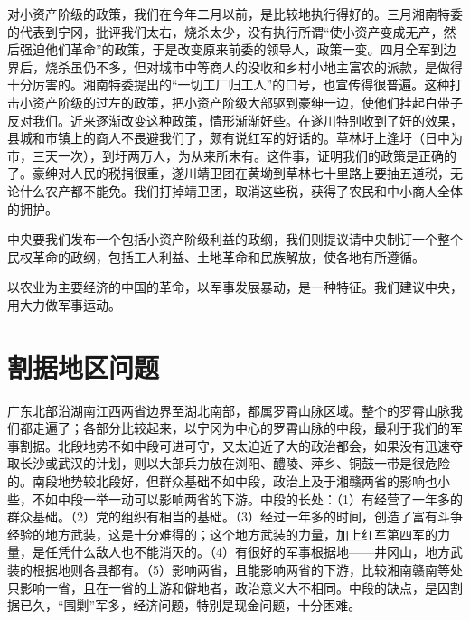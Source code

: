 对小资产阶级的政策，我们在今年二月以前，是比较地执行得好的。三月湘南特委的代表到宁冈，批评我们太右，烧杀太少，没有执行所谓“使小资产变成无产，然后强迫他们革命”的政策，于是改变原来前委的领导人，政策一变。四月全军到边界后，烧杀虽仍不多，但对城市中等商人的没收和乡村小地主富农的派款，是做得十分厉害的。湘南特委提出的“一切工厂归工人”的口号，也宣传得很普遍。这种打击小资产阶级的过左的政策，把小资产阶级大部驱到豪绅一边，使他们挂起白带子反对我们。近来逐渐改变这种政策，情形渐渐好些。在遂川特别收到了好的效果，县城和市镇上的商人不畏避我们了，颇有说红军的好话的。草林圩上逢圩（日中为市，三天一次），到圩两万人，为从来所未有。这件事，证明我们的政策是正确的了。豪绅对人民的税捐很重，遂川靖卫团在黄坳到草林七十里路上要抽五道税，无论什么农产都不能免。我们打掉靖卫团，取消这些税，获得了农民和中小商人全体的拥护。

中央要我们发布一个包括小资产阶级利益的政纲，我们则提议请中央制订一个整个民权革命的政纲，包括工人利益、土地革命和民族解放，使各地有所遵循。

以农业为主要经济的中国的革命，以军事发展暴动，是一种特征。我们建议中央，用大力做军事运动。

\section{割据地区问题}

广东北部沿湖南江西两省边界至湖北南部，都属罗霄山脉区域。整个的罗霄山脉我们都走遍了；各部分比较起来，以宁冈为中心的罗霄山脉的中段，最利于我们的军事割据。北段地势不如中段可进可守，又太迫近了大的政治都会，如果没有迅速夺取长沙或武汉的计划，则以大部兵力放在浏阳、醴陵、萍乡、铜鼓一带是很危险的。南段地势较北段好，但群众基础不如中段，政治上及于湘赣两省的影响也小些，不如中段一举一动可以影响两省的下游。中段的长处：（1）有经营了一年多的群众基础。（2）党的组织有相当的基础。（3）经过一年多的时间，创造了富有斗争经验的地方武装，这是十分难得的；这个地方武装的力量，加上红军第四军的力量，是任凭什么敌人也不能消灭的。（4）有很好的军事根据地——井冈山，地方武装的根据地则各县都有。（5）影响两省，且能影响两省的下游，比较湘南赣南等处只影响一省，且在一省的上游和僻地者，政治意义大不相同。中段的缺点，是因割据已久，“围剿”军多，经济问题，特别是现金问题，十分困难。

